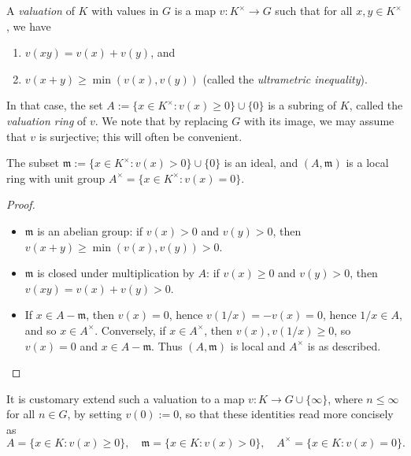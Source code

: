 \documentclass[10pt]{article}
\begin{document}
A \emph{valuation} of \(K\) with values in \(G\) is a map
\(v : K^\times \rightarrow G\)
such that for all \(x,y \in K^\times\),
we have
\begin{enumerate}
\item $v(x y) = v(x) + v(y)$, and
\item $v(x + y) \geq \min(v(x), v(y))$ (called the \emph{ultrametric inequality}).
\end{enumerate}
In that case, the set \(A := \{x \in K^\times : v(x) \geq 0\} \cup
  \{0\}\) is a subring
of \(K\), called the \emph{valuation ring} of \(v\).
We note that by replacing \(G\) with its image, we may assume that
\(v\) is surjective; this will often be convenient.
\begin{lemma}
  The subset $\mathfrak{m} := \{x \in K^\times : v(x) > 0\} \cup
  \{0\}$
  is an ideal, and $(A,\mathfrak{m})$ is a local ring
  with unit group $A^\times = \{x \in K^\times : v(x) = 0\}$.
\end{lemma}
\begin{proof}~
  \begin{itemize}
  \item $\mathfrak{m}$ is an abelian group:
    if $v(x) > 0$ and $v(y) > 0$, then
    $v(x+y) \geq \min(v(x),v(y)) > 0$.
  \item $\mathfrak{m}$ is closed under multiplication by $A$:
    if $v(x) \geq 0$ and $v(y) > 0$,
    then
    $v(x y) = v(x) + v(y) > 0$.
  \item 
    If $x \in A - \mathfrak{m}$,
    then $v(x) = 0$,
    hence $v(1/x) = -v(x) = 0$,
    hence $1/x \in A$,
    and so $x \in A^\times$.
    Conversely,
    if $x \in A^\times$,
    then $v(x), v(1/x) \geq 0$,
    so $v(x) = 0$ and $x \in A - \mathfrak{m}$.
    Thus $(A,\mathfrak{m})$ is local
    and $A^\times$ is as described.
  \end{itemize}
\end{proof}
It is customary
extend such a valuation
to a map \(v : K \rightarrow G \cup \{\infty \}\),
where \(n \leq \infty\) for all \(n \in G\),
by setting \(v(0) := 0\),
so that these identities read more concisely
as
\[
    A = \{x \in K : v(x) \geq 0\},
    \quad
    \mathfrak{m} = \{x \in K : v(x) > 0\},
    \quad
    A^\times  = \{x \in K : v(x) = 0\}.
  \]
\end{document}
